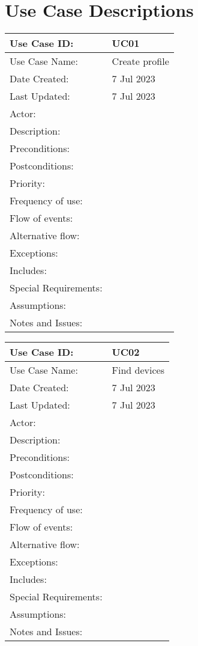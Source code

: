 \documentclass[a4paper]{scrreprt}
\begin{document}
\chapter{Use Case Descriptions}
\renewcommand{\arraystretch}{1.85}
\begin{tabular}{|l|p{10cm}|}
\hline
Use Case ID: & UC01\\
\hline
Use Case Name: & Create profile\\
\hline
Date Created: & 7 Jul 2023\\
\hline
Last Updated: & 7 Jul 2023\\
\hline
Actor: & \\
\hline
Description: & \\
\hline
Preconditions: & \\
\hline
Postconditions: & \\
\hline
Priority: & \\
\hline
Frequency of use: & \\
\hline
Flow of events: & \\
\hline
Alternative flow: & \\
\hline
Exceptions: & \\
\hline
Includes: & \\
\hline
Special Requirements: & \\
\hline
Assumptions: & \\
\hline
Notes and Issues: & \\
\hline
\end{tabular}
\newline
\begin{tabular}{|l|p{10cm}|}
\hline
Use Case ID: & UC02\\
\hline
Use Case Name: & Find devices\\
\hline
Date Created: & 7 Jul 2023\\
\hline
Last Updated: & 7 Jul 2023\\
\hline
Actor: & \\
\hline
Description: & \\
\hline
Preconditions: & \\
\hline
Postconditions: & \\
\hline
Priority: & \\
\hline
Frequency of use: & \\
\hline
Flow of events: & \\
\hline
Alternative flow: & \\
\hline
Exceptions: & \\
\hline
Includes: & \\
\hline
Special Requirements: & \\
\hline
Assumptions: & \\
\hline
Notes and Issues: & \\
\hline
\end{tabular}
\newline
\end{document}
